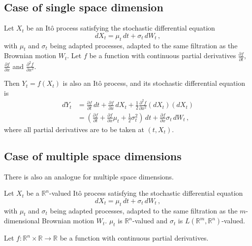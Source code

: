 \documentclass[12pt]{article}
\newcommand{\real}{\mathbb{R}}
\providecommand{\pd}[2]{\frac{\partial #1}{\partial #2}}
\providecommand{\pdd}[2]{\frac{\partial^2 #1}{\partial #2}}
\begin{document}
\subsection{Case of single space dimension}

Let $X_t$ be an It\^o process satisfying the stochastic
differential equation
\[
dX_t = \mu_t \, dt + \sigma_t \, dW_t\,,
\]
with $\mu_t$ and $\sigma_t$ being adapted processes,
adapted to the same filtration as the Brownian motion $W_t$. 
Let $f$ be a function with continuous partial derivatives
$\pd{f}{t}$, $\pd{f}{x}$ and $\pdd{f}{x^2}$.

Then $Y_t = f(X_t)$ is also an It\^o process, and its stochastic
differential equation
is
\begin{align*}
dY_t &= \pd{f}{t} \, dt + \pd{f}{x} \, dX_t + \frac12 \pdd{f}{x^2} (dX_t)(dX_t)
\\
&= \left( \pd{f}{t} + \pd{f}{x} \mu_t + \frac12 \sigma_t^2 \right) \, dt
+ \pd{f}{x} \sigma_t \, dW_t\,,
\end{align*}
where all partial derivatives are to be taken at $(t,X_t)$.

\subsection{Case of multiple space dimensions}

There is also an analogue for multiple space dimensions.

Let $X_t$ be a $\real^n$-valued It\^o process satisfying the stochastic
differential equation
\[
dX_t = \mu_t \, dt + \sigma_t \, dW_t\,,
\]
with $\mu_t$ and $\sigma_t$ being adapted processes,
adapted to the same filtration as the $m$-dimensional Brownian motion $W_t$. 
$\mu_t$ is $\real^n$-valued and $\sigma_t$ is $L(\real^m, \real^n)$-valued.

Let $f\colon \real^n \times \real \to \real$ be a function with 
continuous partial derivatives.
\end{document}
